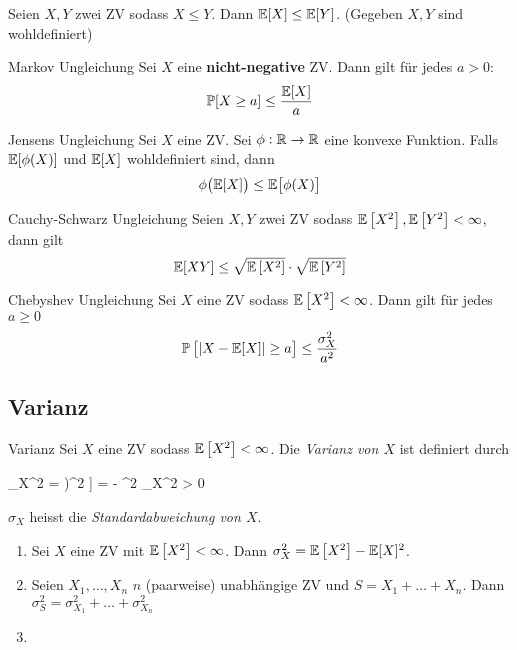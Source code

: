 \begin{prop}
	Seien $X,Y$ zwei ZV sodass $X \leq Y$. Dann $\mathbb{E} [X] \leq \mathbb{E} [Y]$. (Gegeben $X,Y$ sind wohldefiniert)
\end{prop}
\begin{theorem}{Markov Ungleichung}
	Sei $X$ eine \textbf{nicht-negative} ZV. Dann gilt für jedes $a > 0$:
	\begin{equation*}
		\mathbb{P} [X \geq a] \leq \frac{\mathbb{E} [X]}{a} 
	\end{equation*}
\end{theorem}
\begin{theorem}{Jensens Ungleichung}
	Sei $X$ eine ZV. Sei $\phi : \mathbb{R} \rightarrow \mathbb{R}$ eine konvexe Funktion. Falls $\mathbb{E} [\phi (X)]$ und $\mathbb{E} [X]$
	wohldefiniert sind, dann
	\begin{equation*}
		\phi \big(\mathbb{E} [X]\big) \leq \mathbb{E} \big[ \phi (X)\big]
	\end{equation*}
\end{theorem}
\begin{theorem}{Cauchy-Schwarz Ungleichung}
	Seien $X,Y$ zwei ZV sodass $\mathbb{E} \left[ X^2 \right], \mathbb{E} \left[ Y^2 \right] < \infty$, dann gilt
	\begin{equation*}
		\mathbb{E} [XY] \leq \sqrt{\mathbb{E} \left[ X^2 \right]} \cdot \sqrt{\mathbb{E} \left[ Y^2 \right]}
	\end{equation*}
\end{theorem}
\begin{theorem}{Chebyshev Ungleichung}
	Sei $X$ eine ZV sodass $\mathbb{E} \left[ X^2 \right] < \infty$. Dann gilt für jedes $a \geq 0$
	\begin{equation*}
		\mathbb{P} \left[ |X - \mathbb{E} [X] | \geq a \right] \leq \frac{\sigma_X^2}{a^2} 
	\end{equation*}
\end{theorem}

\subsection{Varianz}%
\label{sub:varianz}

\begin{definition}{Varianz}
	Sei $X$ eine ZV sodass $\mathbb{E} \left[ X^2 \right] < \infty$. Die \emph{Varianz von $X$} ist definiert durch
	\begin{iequation}
		\sigma_X^2 = \E \left[ (X - \E[X])^2 \right] = \E \left[ X^2 \right] - \E [X]^2 \qquad \sigma_X^2 > 0
	\end{iequation}
	$\sigma_X$ heisst die \emph{Standardabweichung von $X$}.
\end{definition}
\begin{tcolorbox}[lemmacore]
	\begin{enumerate}
		\item Sei $X$ eine ZV mit $\mathbb{E} \left[ X^2 \right] < \infty$. Dann $ \sigma_X^2 = \mathbb{E} \left[ X^2 \right] - \mathbb{E} [X]^2$.
		\item Seien $X_1 , \ldots , X_n$ $n$ (paarweise) unabhängige ZV und $S = X_1 + \ldots + X_n$. Dann $\sigma_S^2 =
				\sigma_{X_1}^2 + \ldots + \sigma_{X_n}^2$
		\item {}
	\end{enumerate}
\end{tcolorbox}


